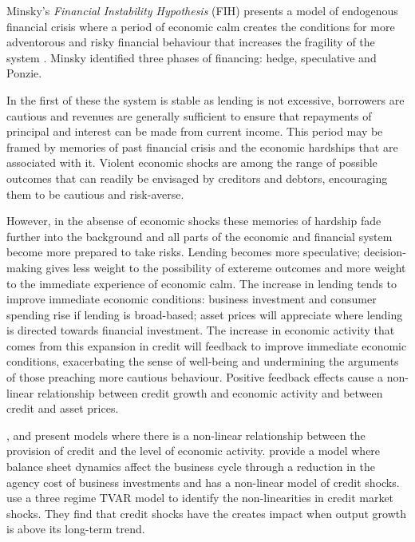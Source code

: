 \documentclass[12pt, a4paper, oneside]{article} %
\begin{document}
Minsky's \emph{Financial Instability Hypothesis} (FIH) presents a model of endogenous financial crisis where a period of economic calm creates the conditions for more adventorous and risky financial behaviour that increases the fragility of the system \citet{MinskyStabilising, MinskyKeynes, MinskyFIH, MinskyLongerWaves}.  Minsky identified three phases of financing:  hedge, speculative and Ponzie.  

In the first of these the system is stable as lending is not excessive, borrowers are cautious and revenues are generally sufficient to ensure that repayments of principal and interest can be made from current income.  This period may be framed by memories of past financial crisis and the economic hardships that are associated with it.  Violent economic shocks are among the range of possible outcomes that can readily be envisaged by creditors and debtors, encouraging them to be cautious and risk-averse. 

However, in the absense of economic shocks these memories of hardship fade further into the background and all parts of the economic and financial system become more prepared to take risks.  Lending becomes more speculative; decision-making gives less weight to the possibility of extereme outcomes and more weight to the immediate experience of economic calm.  The increase in lending tends to improve immediate economic conditions:  business investment and consumer spending rise if lending is broad-based; asset prices will appreciate where lending is directed towards financial investment.  The increase in economic activity that comes from this expansion in credit will feedback to improve immediate economic conditions, exacerbating the sense of well-being and undermining the arguments of those preaching more cautious behaviour.  Positive feedback effects cause a non-linear relationship between credit growth and economic activity and between credit and asset prices. 

\citet{Bernanke1999chapter}, \citet{BernankeGertler} and \citet{Azaraidis} present models where there is a non-linear relationship between  the provision of credit and the level of economic activity. \citet{BernankeGertlerAgency} provide a model where balance sheet dynamics affect the business cycle through a reduction in the agency cost of business investments and \citet{Balke} has a non-linear model of credit shocks.  \citet{Avdjiev2014} use a three regime TVAR model to identify the non-linearities in credit market shocks.  They find that credit shocks have the creates impact when output growth is above its long-term trend. 
\end{document}
